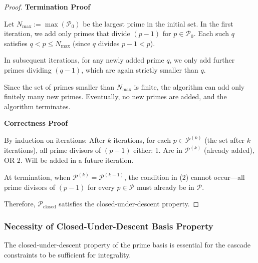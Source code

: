 \begin{proof}

\noindent \textbf{Termination Proof}

Let $N_{\text{max}} := \max(\mathcal{P}_0)$ be the largest prime in the initial set. In the first iteration, we add only primes that divide $(p-1)$ for $p \in \mathcal{P}_0$. Each such $q$ satisfies $q < p \leq N_{\text{max}}$ (since $q$ divides $p-1 < p$).

In subsequent iterations, for any newly added prime $q$, we only add further primes dividing $(q-1)$, which are again strictly smaller than $q$.

Since the set of primes smaller than $N_{\text{max}}$ is finite, the algorithm can add only finitely many new primes. Eventually, no new primes are added, and the algorithm terminates.

\noindent \textbf{Correctness Proof}

By induction on iterations: After $k$ iterations, for each $p \in \mathcal{P}^{(k)}$ (the set after $k$ iterations), all prime divisors of $(p-1)$ either:
1. Are in $\mathcal{P}^{(k)}$ (already added), OR
2. Will be added in a future iteration.

At termination, when $\mathcal{P}^{(k)} = \mathcal{P}^{(k-1)}$, the condition in (2) cannot occur—all prime divisors of $(p-1)$ for every $p \in \mathcal{P}$ must already be in $\mathcal{P}$.

Therefore, $\mathcal{P}_{\text{closed}}$ satisfies the closed-under-descent property.

\end{proof}

\subsubsection{Necessity of Closed-Under-Descent Basis Property}
\label{subsubsec:necessity-closed-descent}

The closed-under-descent property of the prime basis is essential for the cascade constraints to be sufficient for integrality.

